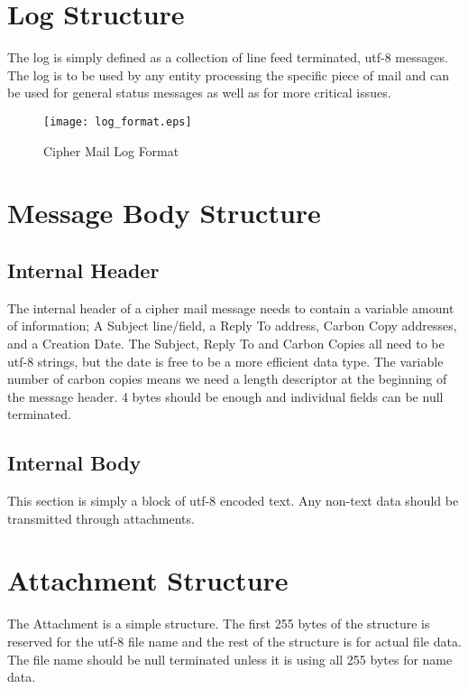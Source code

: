 \documentclass[a4paper,11pt]{article}
\begin{document}
\section{Log Structure}
The log is simply defined as a collection of line feed terminated, utf-8 messages. The log is to be used by any entity processing the specific piece of mail and can be used for general status messages as well as for more critical issues.
\begin{figure}[H]
\centering
\texttt{[image: log\_format.eps]}
\caption{Cipher Mail Log Format}
\end{figure}

\section{Message Body Structure}
\subsection{Internal Header}
The internal header of a cipher mail message needs to contain a variable amount of information; A Subject line/field, a Reply To address, Carbon Copy addresses, and a Creation Date. The Subject, Reply To and Carbon Copies all need to be utf-8 strings, but the date is free to be a more efficient data type. The variable number of carbon copies means we need a length descriptor at the beginning of the message header. 4 bytes should be enough and individual fields can be null terminated.
\subsection{Internal Body}
This section is simply a block of utf-8 encoded text. Any non-text data should be transmitted through attachments.

\section{Attachment Structure}
The Attachment is a simple structure. The first 255 bytes of the structure is reserved for the utf-8 file name and the rest of the structure is for actual file data. The file name should be null terminated unless it is using all 255 bytes for name data.
\end{document}
